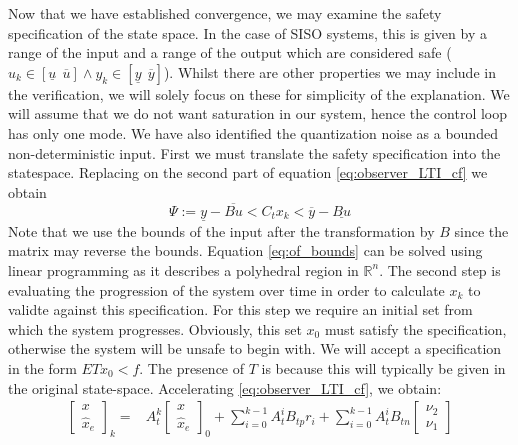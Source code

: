 \documentclass[twocolumn]{autart}    %
\newcommand{\mat}[1]{{#1}}
\renewcommand{\vec}[1]{{#1}}
\begin{document}
{Now that we have established convergence, we may examine the safety
specification of the state space.  In the case of SISO systems, this is
given by a range of the input and a range of the output which are considered
safe ($\vec{u}_k \in [\underline{u}\ \ \overline{u}] \wedge \vec{y}_k \in
[\underline{y}\ \ \overline{y}]$).  Whilst there are other properties we may
include in the verification, we will solely focus on these for simplicity of
the explanation.  We will assume that we do not want saturation in our
system, hence the control loop has only one mode.  We have also identified
the quantization noise as a bounded non-deterministic input.  First we must
translate the safety specification into the statespace.  Replacing on the
second part of equation \eqref{eq:observer_LTI_cf} we obtain
%
\begin{equation}
\Psi := \underline{y}-\overline{\mat{B}\vec{u}}<\mat{C}_t\vec{x}_k<\overline{y}-\underline{\mat{B}\vec{u}}
\label{eq:of_bounds}
\end{equation}
Note that we use the bounds of the input after the transformation by $\mat{B}$ since the matrix may reverse the bounds. Equation \eqref{eq:of_bounds} can be solved using linear programming as it describes a polyhedral region in $\mathbb{R}^n$.
The second step is evaluating the progression of the system over time in order to calculate $\vec{x}_k$ to validte against this specification. For this step we require an initial set from which the system progresses. Obviously, this set $\vec{x}_0$ must satisfy the specification, otherwise the system will be unsafe to begin with.
We will accept a specification in the form $\mat{E}\mat{T}\vec{x}_0<\mat{f}$. The presence of $\mat{T}$ is because this will typically be given in the original state-space.
Accelerating \eqref{eq:observer_LTI_cf}, we obtain:
\begin{align}
\label{eq:acc_observer_LTI_cf}
\left [\begin{array}{c}\vec{x}\\ \hat{\vec{x}}_e \end{array}\right]_k
=&\mat{A}_t^k
\left [\begin{array}{c}\vec{x}\\ \hat{\vec{x}}_e \end{array}\right]_0
+\sum_{i=0}^{k-1} \mat{A}_t^i \mat{B}_{tp} \vec{r}_i
+\sum_{i=0}^{k-1} \mat{A}_t^i \mat{B}_{tn}\left [\begin{array}{c}\vec{\nu}_2\\ \vec{\nu}_1\end{array}\right] \nonumber\\

\end{align}}
\end{document}
